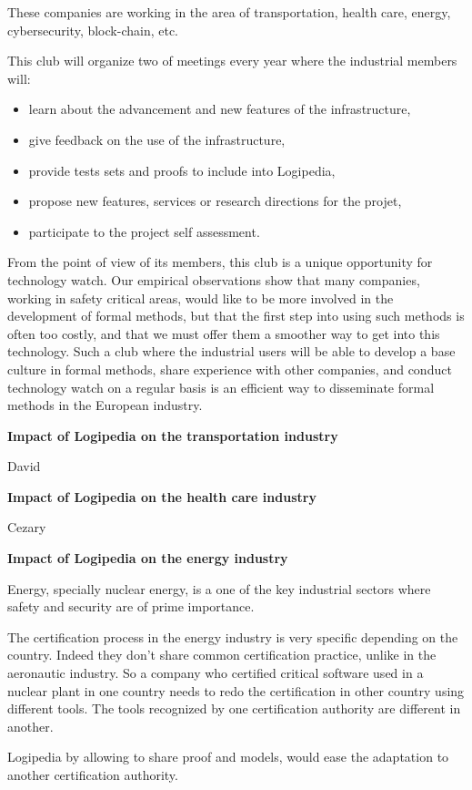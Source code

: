 These companies are working in the area of transportation, health
care, energy, cybersecurity, block-chain, etc.

This club will organize two of meetings every year where the
industrial members will:
\begin{itemize}
\item learn about the advancement and new features of the infrastructure,
\item give feedback on the use of the infrastructure,
\item provide tests sets and proofs to include into Logipedia,
\item propose new features, services or research directions for the projet,
\item participate to the project self assessment.
\end{itemize}
From the point of view of its members, this club is a unique
opportunity for technology watch. Our empirical observations show that
many companies, working in safety critical areas, would like to be
more involved in the development of formal methods, but that the first
step into using such methods is often too costly, and that we must
offer them a smoother way to get into this technology. Such a club
where the industrial users will be able to develop a base culture in
formal methods, share experience with other companies, and conduct
technology watch on a regular basis is an efficient way to disseminate
formal methods in the European industry.

\begin{framed}
{\bf \Large Impact of Logipedia on the transportation industry}

{\color{red} David}  
\end{framed}

\begin{framed}
{\bf \Large Impact of Logipedia on the health care industry}

{\color{red} Cezary}  
\end{framed}

\begin{framed}
{\bf \Large Impact of Logipedia on the energy industry}

\medskip

Energy, specially nuclear energy, is a one of the key industrial sectors 
where safety and security are of prime importance.

The certification process in the energy industry is very specific
depending on the country. Indeed they don't share common certification
practice, unlike in the aeronautic industry. So a company who
certified critical software used in a nuclear plant in one country
needs to redo the certification in other country using different
tools. The tools recognized by one certification authority are
different in another.

Logipedia by allowing to share proof and models,
would ease the adaptation to another certification authority.
\end{framed}

